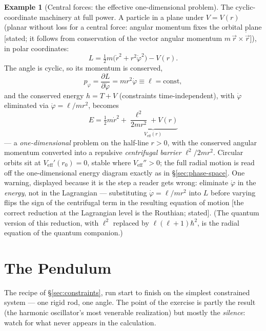 \documentclass[11pt]{article}
\theoremstyle{plain}
\theoremstyle{definition}
\newtheorem{example}[theorem]{Example}
\theoremstyle{remark}
\newcommand{\pd}[2]{\frac{\partial #1}{\partial #2}}
\newcommand{\vr}{\vec{r}}
\begin{document}
\begin{example}[Central forces: the effective one-dimensional
problem]\label{ex:central-force}
The cyclic-coordinate machinery at full power. A particle in a plane
under $V = V(r)$ (planar without loss for a central force: angular
momentum fixes the orbital plane [stated; it follows from conservation
of the vector angular momentum $m\,\vr\times\dot\vr$]), in polar
coordinates:
\begin{equation}
  L = \tfrac12 m\bigl(\dot r^2 + r^2\dot\varphi^2\bigr) - V(r).
\end{equation}
The angle is cyclic, so its momentum is conserved,
\begin{equation}
  p_\varphi = \pd{L}{\dot\varphi} = m r^2\dot\varphi \equiv \ell
  = \text{const},
\end{equation}
and the conserved energy $h = T + V$ (constraints time-independent),
with $\dot\varphi$ eliminated via $\dot\varphi = \ell/mr^2$, becomes
\begin{equation}
  \boxed{\;
  E = \tfrac12 m\dot r^2
  + \underbrace{\frac{\ell^2}{2m r^2} + V(r)}_{\displaystyle
    V_{\text{eff}}(r)}
  \;}
\end{equation}
--- a \emph{one-dimensional} problem on the half-line $r > 0$, with
the conserved angular momentum converted into a repulsive
\emph{centrifugal barrier} $\ell^2/2mr^2$. Circular orbits sit at
$V_{\text{eff}}'(r_0) = 0$, stable where $V_{\text{eff}}'' > 0$; the
full radial motion is read off the one-dimensional energy diagram
exactly as in \S\ref{sec:phase-space}. One warning, displayed
because it is the step a reader gets wrong: eliminate $\dot\varphi$
in the \emph{energy}, not in the Lagrangian --- substituting
$\dot\varphi = \ell/mr^2$ into $L$ before varying flips the sign of
the centrifugal term in the resulting equation of motion [the
correct reduction at the Lagrangian level is the Routhian; stated].
(The quantum version of this reduction, with $\ell^2$ replaced by
$\ell(\ell+1)\hbar^2$, is the radial equation of the quantum
companion.)
\end{example}

\section{The Pendulum}
\label{sec:pendulum}

The recipe of \S\ref{sec:constraints}, run start to finish on the simplest
constrained system --- one rigid rod, one angle. The point of the exercise
is partly the result (the harmonic oscillator's most venerable
realization) but mostly the \emph{silence}: watch for what never appears
in the calculation.
\end{document}
